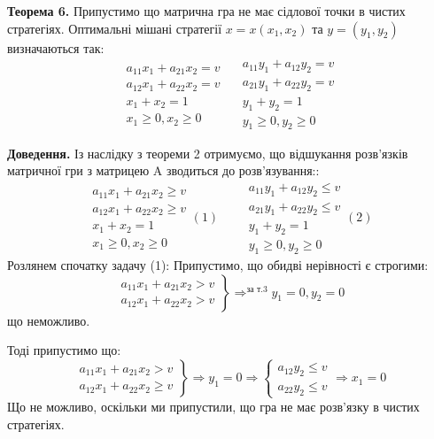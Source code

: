 \documentclass[12pt,a4paper]{report}
\begin{document}
{\bf Теорема 6.}
Припустимо що матрична гра не має сідлової точки в чистих стратегіях. Оптимальні мішані стратегії $x=x(x_1,x_2)$ та $y=(y_1,y_2)$ визначаються так:				
\[\begin{array}{l}
a_{11}x_1+a_{21}x_2=v \\
a_{12}x_1+a_{22}x_2=v \\
x_1+x_2=1	 \\
x_1 \ge 0, x_2 \ge0
\end{array} \quad
\begin{array}{l}
a_{11}y_1+a_{12}y_2=v \\
a_{21}y_1+a_{22}y_2=v \\
y_1+y_2=1	 \\
y_1\ge0,  y_2\ge0
\end{array}\]

{\bf Доведення.}
Із наслідку з теореми 2 отримуємо, що відшукання розв'язків матричної гри з матрицею A зводиться до розв'язування::
\[\begin{array}{l}
a_{11}x_1+a_{21}x_2\ge v \\
a_{12}x_1+a_{22}x_2\ge v \\
x_1+x_2=1	 \\
x_1 \ge 0, x_2 \ge0
\end{array} (1) \qquad 
\begin{array}{l}
a_{11}y_1+a_{12}y_2\le v \\
a_{21}y_1+a_{22}y_2\le v \\
y_1+y_2=1	 \\
y_1\ge0,  y_2\ge0
\end{array} (2)\]
Розлянем спочатку задачу (1):
Припустимо, що обидві нерівності є строгими: 
\[\left.\begin{array}{l}
a_{11}x_1+a_{21}x_2> v \\
a_{12}x_1+a_{22}x_2> v 
\end{array} \right \} \mathop{\Longrightarrow}^{\mbox{за т.3}} y_1=0, y_2=0 \]
що неможливо.

Тоді припустимо що:
\[\left.\begin{array}{l}
a_{11}x_1+a_{21}x_2> v \\
a_{12}x_1+a_{22}x_2 \ge v
\end{array} \right \} \Rightarrow y_1=0 \Rightarrow \left \{
\begin{array}{l}
a_{12}y_2\le v \\
a_{22}y_2\le v
\end{array} \right. \Rightarrow x_1=0\]
Що не можливо, оскільки ми припустили, що гра не має розв'язку в чистих стратегіях.
\end{document}
